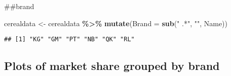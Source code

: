 \documentclass[
]{article}
\newenvironment{Shaded}{\begin{snugshade}}{\end{snugshade}}
\newcommand{\AttributeTok}[1]{\textcolor[rgb]{0.13,0.29,0.53}{#1}}
\newcommand{\FunctionTok}[1]{\textcolor[rgb]{0.13,0.29,0.53}{\textbf{#1}}}
\newcommand{\NormalTok}[1]{#1}
\newcommand{\OtherTok}[1]{\textcolor[rgb]{0.56,0.35,0.01}{#1}}
\newcommand{\SpecialCharTok}[1]{\textcolor[rgb]{0.81,0.36,0.00}{\textbf{#1}}}
\newcommand{\StringTok}[1]{\textcolor[rgb]{0.31,0.60,0.02}{#1}}
\begin{document}
\#\#brand

\begin{Shaded}
\begin{Highlighting}[]
\NormalTok{cerealdata }\OtherTok{\textless{}{-}}\NormalTok{ cerealdata }\SpecialCharTok{\%\textgreater{}\%}
  \FunctionTok{mutate}\NormalTok{(}\AttributeTok{Brand =} \FunctionTok{sub}\NormalTok{(}\StringTok{" .*"}\NormalTok{, }\StringTok{""}\NormalTok{, Name))}
\end{Highlighting}
\end{Shaded}

\begin{Shaded}
\end{Shaded}

\begin{verbatim}
## [1] "KG" "GM" "PT" "NB" "QK" "RL"
\end{verbatim}

\subsection{Plots of market share grouped by
brand}\label{plots-of-market-share-grouped-by-brand}
\end{document}
